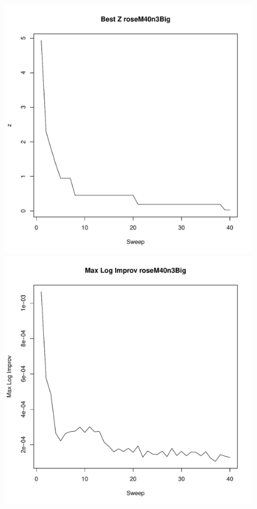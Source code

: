 \documentclass{article}
\begin{document}
\clearpage

\begin{figure}
        \begin{center}
                \begin{minipage}[h!]{0.49\textwidth}
                        \includegraphics[width=1.0\textwidth]{roseM40n3BigCoord.pdf}
                \end{minipage}
                \begin{minipage}[h!]{0.49\textwidth}
                        \includegraphics[width=1.0\textwidth]{roseM40n3BigMLI.pdf}
                \end{minipage}
        \end{center}
\end{figure}
\end{document}
